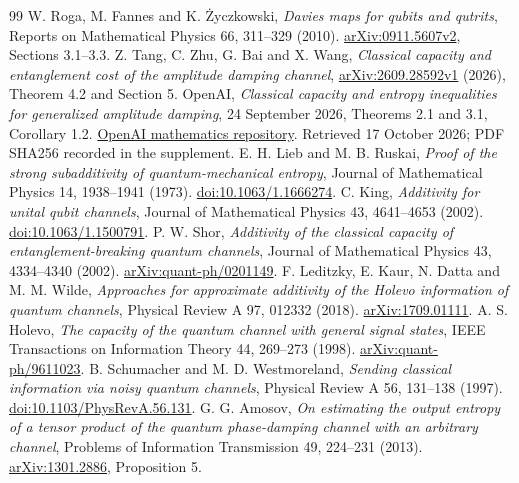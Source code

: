 \documentclass[11pt]{article}
\begin{document}
\begin{thebibliography}{99}
\small\setlength{\itemsep}{3pt}
 W. Roga, M. Fannes and K. \.{Z}yczkowski, \emph{Davies maps for qubits and qutrits}, Reports on Mathematical Physics 66, 311--329 (2010). \href{https://arxiv.org/abs/0911.5607}{arXiv:0911.5607v2}, Sections 3.1--3.3.
 Z. Tang, C. Zhu, G. Bai and X. Wang, \emph{Classical capacity and entanglement cost of the amplitude damping channel}, \href{https://arxiv.org/abs/2609.28592}{arXiv:2609.28592v1} (2026), Theorem 4.2 and Section 5.
 OpenAI, \emph{Classical capacity and entropy inequalities for generalized amplitude damping}, 24 September 2026, Theorems 2.1 and 3.1, Corollary 1.2. \href{https://github.com/openai/math/tree/main/preprints/Classical-capacity-and-entropy-inequalities-for-generalized-amplitude-damping-September-24-2026}{OpenAI mathematics repository}. Retrieved 17 October 2026; PDF SHA256 recorded in the supplement.
 E. H. Lieb and M. B. Ruskai, \emph{Proof of the strong subadditivity of quantum-mechanical entropy}, Journal of Mathematical Physics 14, 1938--1941 (1973). \href{https://doi.org/10.1063/1.1666274}{doi:10.1063/1.1666274}.
 C. King, \emph{Additivity for unital qubit channels}, Journal of Mathematical Physics 43, 4641--4653 (2002). \href{https://doi.org/10.1063/1.1500791}{doi:10.1063/1.1500791}.
 P. W. Shor, \emph{Additivity of the classical capacity of entanglement-breaking quantum channels}, Journal of Mathematical Physics 43, 4334--4340 (2002). \href{https://arxiv.org/abs/quant-ph/0201149}{arXiv:quant-ph/0201149}.
 F. Leditzky, E. Kaur, N. Datta and M. M. Wilde, \emph{Approaches for approximate additivity of the Holevo information of quantum channels}, Physical Review A 97, 012332 (2018). \href{https://arxiv.org/abs/1709.01111}{arXiv:1709.01111}.
 A. S. Holevo, \emph{The capacity of the quantum channel with general signal states}, IEEE Transactions on Information Theory 44, 269--273 (1998). \href{https://arxiv.org/abs/quant-ph/9611023}{arXiv:quant-ph/9611023}.
 B. Schumacher and M. D. Westmoreland, \emph{Sending classical information via noisy quantum channels}, Physical Review A 56, 131--138 (1997). \href{https://doi.org/10.1103/PhysRevA.56.131}{doi:10.1103/PhysRevA.56.131}.
 G. G. Amosov, \emph{On estimating the output entropy of a tensor product of the quantum phase-damping channel with an arbitrary channel}, Problems of Information Transmission 49, 224--231 (2013). \href{https://arxiv.org/abs/1301.2886}{arXiv:1301.2886}, Proposition 5.

\end{thebibliography}
\end{document}
